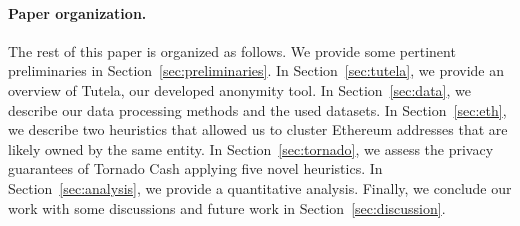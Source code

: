 \paragraph{Paper organization.} The rest of this paper is organized as follows. We provide some pertinent preliminaries in Section~\ref{sec:preliminaries}. In Section~\ref{sec:tutela}, we provide an overview of Tutela, our developed anonymity tool. In Section~\ref{sec:data}, we describe our data processing methods and the used datasets. In Section~\ref{sec:eth}, we describe two heuristics that allowed us to cluster Ethereum addresses that are likely owned by the same entity. In Section~\ref{sec:tornado}, we assess the privacy guarantees of Tornado Cash applying five novel heuristics. In Section~\ref{sec:analysis}, we provide a quantitative analysis. Finally, we conclude our work with some discussions and future work in Section~\ref{sec:discussion}.